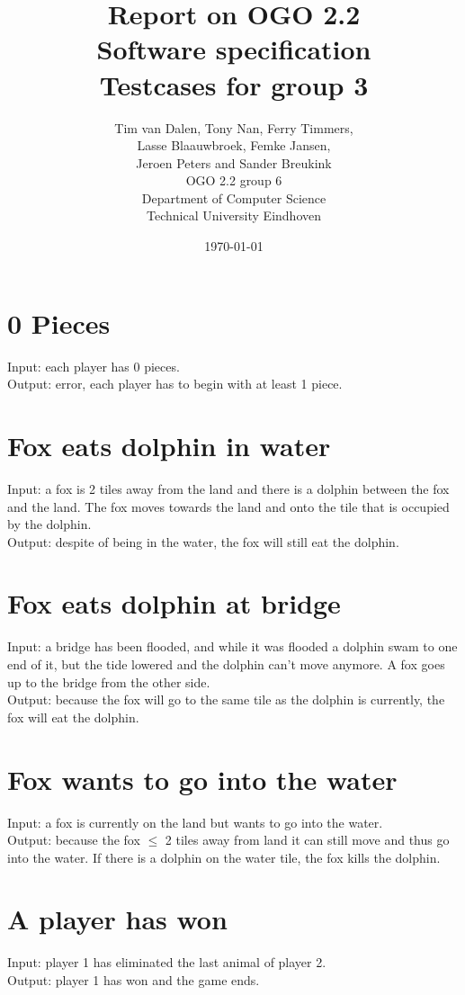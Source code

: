 \documentclass[a4paper,11pt]{article}
\title{Report on OGO 2.2 \\ Software specification\\ Testcases for group 3}
\author{
        Tim van Dalen, Tony Nan, Ferry Timmers, \\ Lasse Blaauwbroek, Femke Jansen, \\Jeroen Peters and Sander Breukink\\ OGO 2.2 group 6 \\
                Department of Computer Science\\
        Technical University Eindhoven\\
}
\date{\today}
\begin{document}
\maketitle
	
	\section{0 Pieces}
    Input: each player has 0 pieces.\\
    Output: error, each player has to begin with at least 1 piece.

	\section{Fox eats dolphin in water}
    Input: a fox is 2 tiles away from the land and there is a dolphin between the fox and the land. The fox moves towards the land and onto the tile that is occupied by the dolphin.\\
    Output: despite of being in the water, the fox will still eat the dolphin.\\
    
    \section{Fox eats dolphin at bridge}
    Input: a bridge has been flooded, and while it was flooded a dolphin swam to one end of it, but the tide lowered and the dolphin can't move anymore. A fox goes up to the bridge from the other side.\\
    Output: because the fox will go to the same tile as the dolphin is currently, the fox will eat the dolphin.\\
    
    \section{Fox wants to go into the water}
    Input: a fox is currently on the land but wants to go into the water.\\
    Output: because the fox $\leq$ 2 tiles away from land it can still move and thus go into the water. If there is a dolphin on the water tile, the fox kills the dolphin.\\
    
    \section{A player has won}
    Input: player 1 has eliminated the last animal of player 2.\\
    Output: player 1 has won and the game ends.\\
    
\end{document}
